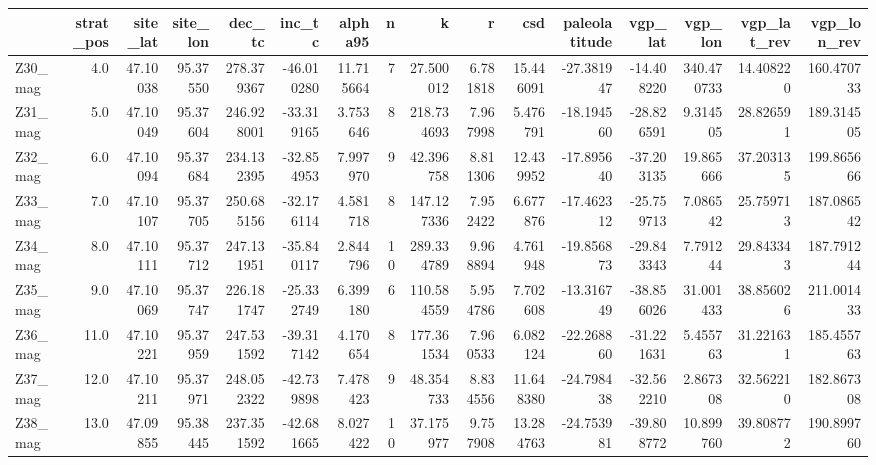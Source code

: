 \documentclass[11pt]{article}
\begin{document}
\begin{sidewaystable}
    {\tiny\begin{tabular}{lrrrrrrrrrrrrrrr}
\toprule
{} &  strat\_pos &  site\_lat &  site\_lon &      dec\_tc &     inc\_tc &    alpha95 &   n &           k &         r &        csd &  paleolatitude &    vgp\_lat &     vgp\_lon &  vgp\_lat\_rev &  vgp\_lon\_rev \\
\midrule
Z30\_mag &        4.0 &  47.10038 &  95.37550 &  278.379367 & -46.010280 &  11.715664 &   7 &   27.500012 &  6.781818 &  15.446091 &     -27.381947 & -14.408220 &  340.470733 &    14.408220 &   160.470733 \\
Z31\_mag &        5.0 &  47.10049 &  95.37604 &  246.928001 & -33.319165 &   3.753646 &   8 &  218.734693 &  7.967998 &   5.476791 &     -18.194560 & -28.826591 &    9.314505 &    28.826591 &   189.314505 \\
Z32\_mag &        6.0 &  47.10094 &  95.37684 &  234.132395 & -32.854953 &   7.997970 &   9 &   42.396758 &  8.811306 &  12.439952 &     -17.895640 & -37.203135 &   19.865666 &    37.203135 &   199.865666 \\
Z33\_mag &        7.0 &  47.10107 &  95.37705 &  250.685156 & -32.176114 &   4.581718 &   8 &  147.127336 &  7.952422 &   6.677876 &     -17.462312 & -25.759713 &    7.086542 &    25.759713 &   187.086542 \\
Z34\_mag &        8.0 &  47.10111 &  95.37712 &  247.131951 & -35.840117 &   2.844796 &  10 &  289.334789 &  9.968894 &   4.761948 &     -19.856873 & -29.843343 &    7.791244 &    29.843343 &   187.791244 \\
Z35\_mag &        9.0 &  47.10069 &  95.37747 &  226.181747 & -25.332749 &   6.399180 &   6 &  110.584559 &  5.954786 &   7.702608 &     -13.316749 & -38.856026 &   31.001433 &    38.856026 &   211.001433 \\
Z36\_mag &       11.0 &  47.10221 &  95.37959 &  247.531592 & -39.317142 &   4.170654 &   8 &  177.361534 &  7.960533 &   6.082124 &     -22.268860 & -31.221631 &    5.455763 &    31.221631 &   185.455763 \\
Z37\_mag &       12.0 &  47.10211 &  95.37971 &  248.052322 & -42.739898 &   7.478423 &   9 &   48.354733 &  8.834556 &  11.648380 &     -24.798438 & -32.562210 &    2.867308 &    32.562210 &   182.867308 \\
Z38\_mag &       13.0 &  47.09855 &  95.38445 &  237.351592 & -42.681665 &   8.027422 &  10 &   37.175977 &  9.757908 &  13.284763 &     -24.753981 & -39.808772 &   10.899760 &    39.808772 &   190.899760 \\

\end{tabular}}
\end{sidewaystable}
\end{document}
